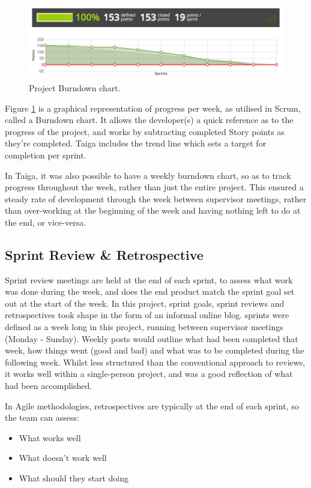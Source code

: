 \begin{figure}[H]
  \centering
  \includegraphics[width=\textwidth]{Chapter2/software-img/burndown.png}
  \caption{Project Burndown chart.}
  \label{fig:burndown}
\end{figure}

Figure \ref{fig:burndown} is a graphical representation of progress per week, as utilised in Scrum, called a Burndown chart. It allows the developer(s) a quick reference as to the progress of the project, and works by subtracting completed Story points as they're completed. Taiga includes the trend line which sets a target for completion per sprint.

In Taiga, it was also possible to have a weekly burndown chart, so as to track progress throughout the week, rather than just the entire project. This ensured a steady rate of development through the week between supervisor meetings, rather than over-working at the beginning of the week and having nothing left to do at the end, or vice-versa.

\subsection{Sprint Review \& Retrospective}

Sprint review meetings are held at the end of each sprint, to assess what work was done during the week, and does the end product match the sprint goal set out at the start of the week. In this project, sprint goals, sprint reviews and retrospectives took shape in the form of an informal online blog. sprints were defined as a week long in this project, running between supervisor meetings (Monday - Sunday). Weekly posts would outline what had been completed that week, how things went (good and bad) and what was to be completed during the following week. Whilst less structured than the conventional approach to reviews, it works well within a single-person project, and was a good reflection of what had been accomplished.

In Agile methodologies, retrospectives are typically at the end of each sprint, so the team can assess:
\begin{itemize}
  \item What works well
  \item What doesn't work well
  \item What should they start doing
\end{itemize}

